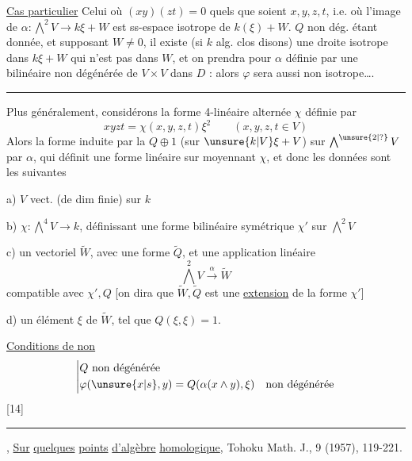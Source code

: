 \uline{Cas particulier} Celui où $(xy)(zt)=0$ \inserted{[i.e. $(H^1)\deleted{\unsure{H|\otimes}}^{3}=0$ dans $H^4$ !]} quels que soient $x,y,z,t$, i.e. où l'image de $\alpha:\bigwedge^2 V\to k\xi+W$ est   ss-espace isotrope de $k(\xi)+W$.  $Q$ non dég. étant donnée, et supposant $W\ne0$, il existe (si $k$ alg. clos disons) une droite isotrope  dans $k\xi+W$ qui n'est pas dans $W$, et on prendra pour $\alpha$  définie par une  bilinéaire  non dégénérée  de $V\times V$ dans $D$ : alors $\varphi$ sera aussi non isotrope\ldots.

\begin{center}\rule{3em}{.4pt}\end{center}

Plus généralement, considérons la forme 4-linéaire alternée $\chi$ définie par
\[
xyzt=\chi(x,y,z,t)\xi^2\qquad (x,y,z,t\in V)
\]
Alors la forme  induite par la  $Q\oplus1$ (sur $\unsure{k|V}\xi+V$) sur $\bigwedge^{\unsure{2|?}}V$ par $\alpha$, qui définit une  forme linéaire sur
moyennant $\chi$, et donc les données sont les suivantes

a) $V$ vect. (de dim finie) sur $k$


b) $\chi:\bigwedge^4 V\to k$, définissant une forme bilinéaire symétrique $\chi'$ sur $\bigwedge^2 V$

c) un vectoriel $\widetilde W$, avec une forme  $\widetilde Q$, et une application linéaire
\[
\bigwedge^2 V\xrightarrow{\alpha}\widetilde W
\]
compatible avec $\chi',Q$ [on dira que $\widetilde W,\widetilde Q$ est une \uline{extension} de la forme $\chi'$]

d) un élément $\xi$ de $\widetilde W$, tel que $Q(\xi,\xi)=1$.

\uline{Conditions de non }
\[
\left|\begin{aligned}
&Q\ \text{non dégénérée}\\
&\varphi(\unsure{x|s},y)=Q(\alpha(x\wedge y),\xi)\quad\text{non dégénérée}
\end{aligned}\right.
\]
[14]\quad \rule{4.7em}{.4pt}, \uline{Sur} \uline{quelques} \uline{points} \uline{d'algèbre} \uline{homologique}, Tohoku Math. J., 9 (1957), 119-221.

